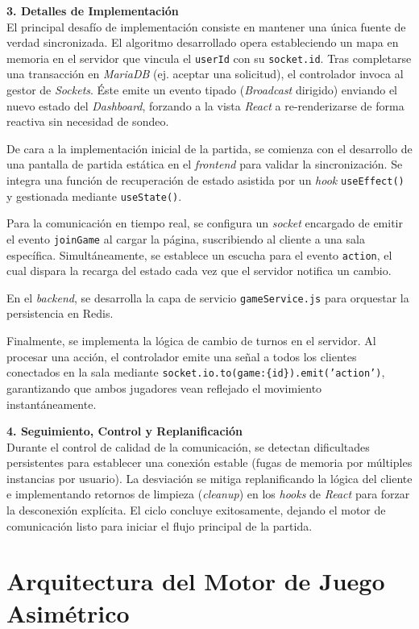 \textbf{3. Detalles de Implementación} \\
El principal desafío de implementación consiste en mantener una única fuente de verdad sincronizada. El algoritmo desarrollado opera estableciendo un mapa en memoria en el servidor que vincula el \texttt{userId} con su \texttt{socket.id}. Tras completarse una transacción en \textit{MariaDB} (ej. aceptar una solicitud), el controlador invoca al gestor de \textit{Sockets}. Éste emite un evento tipado (\textit{Broadcast} dirigido) enviando el nuevo estado del \textit{Dashboard}, forzando a la vista \textit{React} a re-renderizarse de forma reactiva sin necesidad de sondeo.

De cara a la implementación inicial de la partida, se comienza con el desarrollo de una pantalla de partida estática en el \textit{frontend} para validar la sincronización. Se integra una función de recuperación de estado asistida por un \textit{hook} \texttt{useEffect()} y gestionada mediante \texttt{useState()}.

Para la comunicación en tiempo real, se configura un \textit{socket} encargado de emitir el evento \texttt{joinGame} al cargar la página, suscribiendo al cliente a una sala específica. Simultáneamente, se establece un escucha para el evento \texttt{action}, el cual dispara la recarga del estado cada vez que el servidor notifica un cambio.

En el \textit{backend}, se desarrolla la capa de servicio \texttt{gameService.js} para orquestar la persistencia en Redis.

Finalmente, se implementa la lógica de cambio de turnos en el servidor. Al procesar una acción, el controlador emite una señal a todos los clientes conectados en la sala mediante \texttt{socket.io.to(game:\{id\}).emit('action')}, garantizando que ambos jugadores vean reflejado el movimiento instantáneamente.

\textbf{4. Seguimiento, Control y Replanificación} \\
Durante el control de calidad de la comunicación, se detectan dificultades persistentes para establecer una conexión estable (fugas de memoria por múltiples instancias por usuario). La desviación se mitiga replanificando la lógica del cliente e implementando retornos de limpieza (\textit{cleanup}) en los \textit{hooks} de \textit{React} para forzar la desconexión explícita. El ciclo concluye exitosamente, dejando el motor de comunicación listo para iniciar el flujo principal de la partida.

\section{Arquitectura del Motor de Juego Asimétrico}

